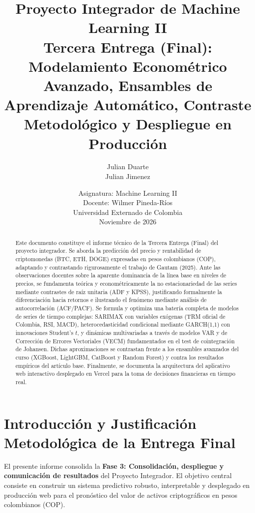 \documentclass[12pt,letterpaper]{article}
\title{\textbf{Proyecto Integrador de Machine Learning II}\\
\large Tercera Entrega (Final): Modelamiento Econométrico Avanzado, Ensambles de Aprendizaje Automático, Contraste Metodológico y Despliegue en Producción}
\author{
    Julian Duarte \\
    Julian Jimenez
}
\date{Asignatura: Machine Learning II\\
Docente: Wilmer Pineda-Ríos\\
Universidad Externado de Colombia\\
Noviembre de 2026}
\begin{document}
\maketitle

\begin{abstract}
Este documento constituye el informe técnico de la Tercera Entrega (Final) del proyecto integrador. Se aborda la predicción del precio y rentabilidad de criptomonedas (BTC, ETH, DOGE) expresadas en pesos colombianos (COP), adaptando y contrastando rigurosamente el trabajo de Gautam (2025). Ante las observaciones docentes sobre la aparente dominancia de la línea base en niveles de precios, se fundamenta teórica y econométricamente la no estacionariedad de las series mediante contrastes de raíz unitaria (ADF y KPSS), justificando formalmente la diferenciación hacia retornos e ilustrando el fenómeno mediante análisis de autocorrelación (ACF/PACF). Se formula y optimiza una batería completa de modelos de series de tiempo complejas: SARIMAX con variables exógenas (TRM oficial de Colombia, RSI, MACD), heterocedasticidad condicional mediante GARCH(1,1) con innovaciones Student's $t$, y dinámicas multivariadas a través de modelos VAR y de Corrección de Errores Vectoriales (VECM) fundamentados en el test de cointegración de Johansen. Dichas aproximaciones se contrastan frente a los ensambles avanzados del curso (XGBoost, LightGBM, CatBoost y Random Forest) y contra los resultados empíricos del artículo base. Finalmente, se documenta la arquitectura del aplicativo web interactivo desplegado en Vercel para la toma de decisiones financieras en tiempo real.
\end{abstract}

\tableofcontents
\newpage

\section{Introducción y Justificación Metodológica de la Entrega Final}

El presente informe consolida la \textbf{Fase 3: Consolidación, despliegue y comunicación de resultados} del Proyecto Integrador. El objetivo central consiste en construir un sistema predictivo robusto, interpretable y desplegado en producción web para el pronóstico del valor de activos criptográficos en pesos colombianos (COP).
\end{document}
